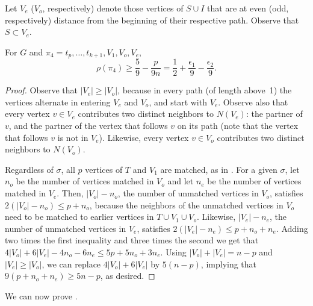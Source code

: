 \documentclass{toc}
\theoremstyle{plain}
\begin{document}
Let $V_e$ ($V_o$, respectively) denote those vertices of $S \cup I$ that are at even (odd, respectively) distance from the beginning of their respective path. Observe that $S \subset V_e$.

\begin{lemma}
	\label{lem:sort2}
	For $G$ and $\pi_4 = t_p, \ldots, t_{k+1}, V_1, V_o, V_e$,
	$$\rho(\pi_4) \ge \frac{5}{9} - \frac{p}{9n} = \frac{1}{2} + \frac{\epsilon_1}{9} - \frac{\epsilon_2}{9}.$$
\end{lemma}

\begin{proof}
	Observe that $|V_e| \ge |V_o|$, because in every path (of length above~1) the vertices alternate in entering $V_e$ and $V_o$, and start with $V_e$. Observe also that every vertex $v \in V_e$ contributes two distinct neighbors to $N(V_e)$: the partner of $v$, and the partner of the vertex that follows $v$ on its path (note that the vertex that follows $v$ is not in $V_e$). Likewise, every vertex $v \in V_o$ contributes two distinct neighbors to $N(V_o)$.
	
	
	
	
	
	Regardless of $\sigma$, all $p$ vertices of $T$ and $V_1$ are matched, as in . For a given $\sigma$, let $n_o$ be the number of vertices matched in $V_o$ and let  $n_e$ be the number of vertices matched in $V_e$.
	Then, $|V_o| - n_o$, the number of unmatched vertices  in $V_o$, satisfies $2(|V_o| - n_o) \le p + n_o$, because the neighbors of the unmatched vertices in $V_o$ need to be matched to earlier vertices in $T \cup V_1 \cup V_o$.
	Likewise,  $|V_e| - n_e$, the number of unmatched vertices  in $V_e$, satisfies $2(|V_e| - n_e) \le p + n_o + n_e$.
	Adding two times the first inequality and three times the second we get that $4|V_o| + 6|V_e| - 4n_o - 6n_e \le 5p + 5n_o + 3n_e$. Using $|V_o| + |V_e| = n-p$ and $|V_e| \ge |V_o|$, we can replace $4|V_o| + 6|V_e|$ by $5(n-p)$, implying that $9(p + n_o + n_e) \ge 5n - p$, as desired.
\end{proof}

%

We can now prove .
\end{document}

